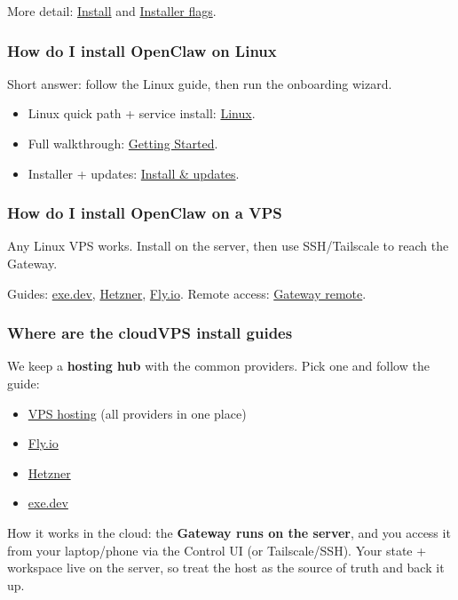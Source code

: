 More detail: \href{/install}{Install} and \href{/install/installer}{Installer flags}.

\subsubsection{How do I install OpenClaw on Linux}


Short answer: follow the Linux guide, then run the onboarding wizard.

\begin{itemize}
  \item Linux quick path + service install: \href{/platforms/linux}{Linux}.
  \item Full walkthrough: \href{/start/getting-started}{Getting Started}.
  \item Installer + updates: \href{/install/updating}{Install \& updates}.
\end{itemize}


\subsubsection{How do I install OpenClaw on a VPS}


Any Linux VPS works. Install on the server, then use SSH/Tailscale to reach the Gateway.

Guides: \href{/install/exe-dev}{exe.dev}, \href{/install/hetzner}{Hetzner}, \href{/install/fly}{Fly.io}.
Remote access: \href{/gateway/remote}{Gateway remote}.

\subsubsection{Where are the cloudVPS install guides}


We keep a \textbf{hosting hub} with the common providers. Pick one and follow the guide:

\begin{itemize}
  \item \href{/vps}{VPS hosting} (all providers in one place)
  \item \href{/install/fly}{Fly.io}
  \item \href{/install/hetzner}{Hetzner}
  \item \href{/install/exe-dev}{exe.dev}
\end{itemize}


How it works in the cloud: the \textbf{Gateway runs on the server}, and you access it
from your laptop/phone via the Control UI (or Tailscale/SSH). Your state + workspace
live on the server, so treat the host as the source of truth and back it up.

